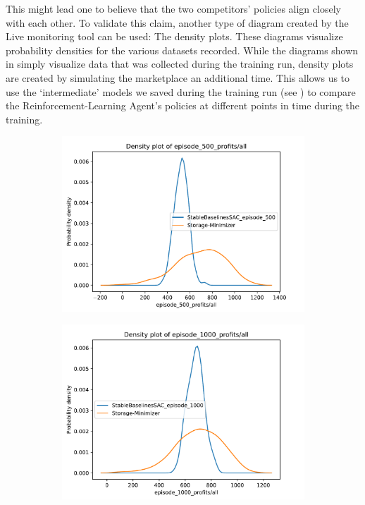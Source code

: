 This might lead one to believe that the two competitors' policies align closely with each other. To validate this claim, another type of diagram created by the Live monitoring tool can be used: The density plots. These diagrams visualize probability densities for the various datasets recorded. While the diagrams shown in  simply visualize data that was collected during the training run, density plots are created by simulating the marketplace an additional time. This allows us to use the `intermediate' models we saved during the training run (see ) to compare the Reinforcement-Learning Agent's policies at different points in time during the training.

\begin{figure}
	\centering
	\begin{subfigure}{0.49\textwidth}
		\centering
		\includegraphics[width = \textwidth]{images/experiments/SACDuopoly/SACDuopolyProfitsDensity1.pdf}\\
		\label{fig:SACDuopolyProfitsDensity1}
	\end{subfigure}
	\begin{subfigure}{0.49\textwidth}
		\centering
		\includegraphics[width = \textwidth]{images/experiments/SACDuopoly/SACDuopolyProfitsDensity2.pdf}\\

\end{subfigure}
\end{figure}
